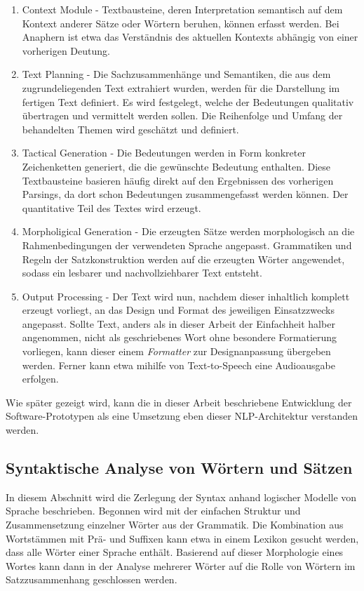 \documentclass[12pt]{report}
\begin{document}
\begin{enumerate}
\item
Context Module - Textbausteine, deren Interpretation semantisch auf dem Kontext anderer Sätze oder Wörtern beruhen, können erfasst werden. Bei Anaphern ist etwa das Verständnis des aktuellen Kontexts abhängig von einer vorherigen Deutung.
\item
Text Planning - Die Sachzusammenhänge und Semantiken, die aus dem zugrundeliegenden Text extrahiert wurden, werden für die Darstellung im fertigen Text definiert. Es wird festgelegt, welche der Bedeutungen qualitativ übertragen und vermittelt werden sollen. Die Reihenfolge und Umfang der behandelten Themen wird geschätzt und definiert.
\item
Tactical Generation - Die Bedeutungen werden in Form konkreter Zeichenketten generiert, die die gewünschte Bedeutung enthalten. Diese Textbausteine basieren häufig direkt auf den Ergebnissen des vorherigen Parsings, da dort schon Bedeutungen zusammengefasst werden können. Der quantitative Teil des Textes wird erzeugt.
\item
Morpholigical Generation - Die erzeugten Sätze werden morphologisch an die Rahmenbedingungen der verwendeten Sprache angepasst. Grammatiken und Regeln der Satzkonstruktion werden auf die erzeugten Wörter angewendet, sodass ein lesbarer und nachvollziehbarer Text entsteht.
\item
Output Processing - Der Text wird nun, nachdem dieser inhaltlich komplett erzeugt vorliegt, an das Design und Format des jeweiligen Einsatzzwecks angepasst. Sollte Text, anders als in dieser Arbeit der Einfachheit halber angenommen, nicht als geschriebenes Wort ohne besondere Formatierung vorliegen, kann dieser einem \textit{Formatter} zur Designanpassung übergeben werden. Ferner kann etwa mihilfe von Text-to-Speech eine Audioausgabe erfolgen. 
\end{enumerate}

Wie später gezeigt wird, kann die in dieser Arbeit beschriebene Entwicklung der Software-Prototypen als eine Umsetzung eben dieser NLP-Architektur verstanden werden.

\subsection[Syntaktische Analyse]{Syntaktische Analyse von Wörtern und Sätzen}
In diesem Abschnitt wird die Zerlegung der Syntax anhand logischer Modelle von Sprache beschrieben. Begonnen wird mit der einfachen Struktur und Zusammensetzung einzelner Wörter aus der Grammatik. Die Kombination aus Wortstämmen mit Prä- und Suffixen kann etwa in einem Lexikon gesucht werden, dass alle Wörter einer Sprache enthält.  Basierend auf dieser Morphologie eines Wortes kann dann in der Analyse mehrerer Wörter auf die Rolle von Wörtern im Satzzusammenhang geschlossen werden. 
\end{document}
